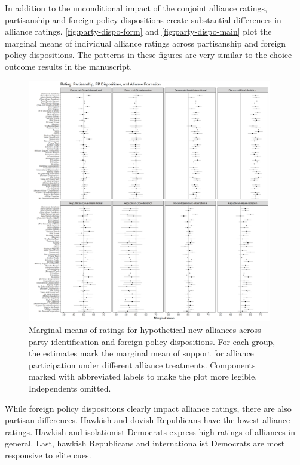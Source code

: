 \documentclass[12pt]{article}
\begin{document}
In addition to the unconditional impact of the conjoint alliance ratings, partisanship and foreign policy dispositions create substantial differences in alliance ratings.
\autoref{fig:party-dispo-form} and \autoref{fig:party-dispo-main} plot the marginal means of individual alliance ratings across partisanship and foreign policy dispositions. 
The patterns in these figures are very similar to the choice outcome results in the manuscript.  

\begin{figure}
	\centering
		\includegraphics[width=0.95\textwidth]{party-dispo-formapp.png}
	\caption{Marginal means of ratings for hypothetical new alliances across party identification and foreign policy dispositions. For each group, the estimates mark the marginal mean of support for alliance participation under different alliance treatments. Components marked with abbreviated labels to make the plot more legible. Independents omitted.}
	\label{fig:party-dispo-form}
\end{figure}


While foreign policy dispositions clearly impact alliance ratings, there are also partisan differences.
Hawkish and dovish Republicans have the lowest alliance ratings. 
Hawkish and isolationist Democrats express high ratings of alliances in general.  
Last, hawkish Republicans and internationalist Democrats are most responsive to elite cues. 
\end{document}
